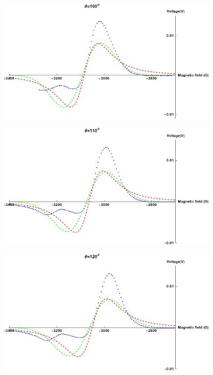 \documentclass[openany,11pt,a4paper]{report}
\begin{document}
\begin{figure}[H]
\centering
\includegraphics[scale=0.6]{100.jpg}
\end{figure}





\begin{figure}[H]
\centering
\includegraphics[scale=0.6]{110.jpg}
\end{figure}





\begin{figure}[H]
\centering
\includegraphics[scale=0.6]{120.jpg}
\end{figure}
\end{document}
